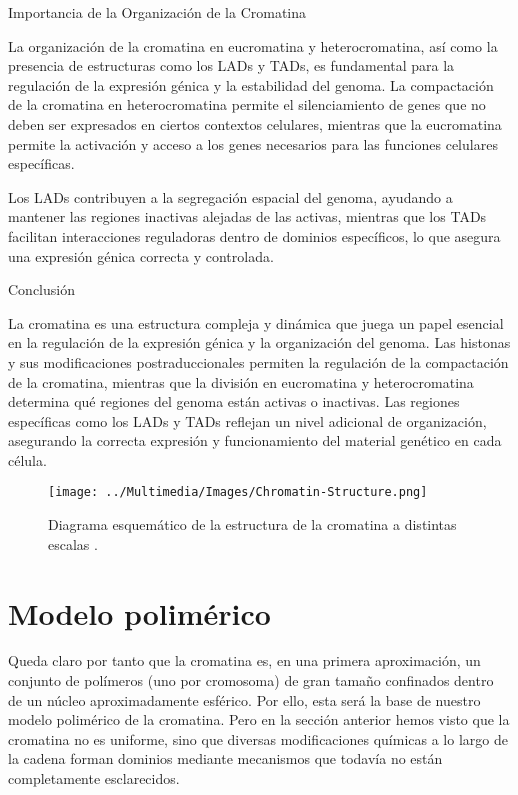 Importancia de la Organización de la Cromatina

La organización de la cromatina en eucromatina y heterocromatina, así como la presencia de estructuras como los LADs y TADs, es fundamental para la regulación de la expresión génica y la estabilidad del genoma. La compactación de la cromatina en heterocromatina permite el silenciamiento de genes que no deben ser expresados en ciertos contextos celulares, mientras que la eucromatina permite la activación y acceso a los genes necesarios para las funciones celulares específicas.

Los LADs contribuyen a la segregación espacial del genoma, ayudando a mantener las regiones inactivas alejadas de las activas, mientras que los TADs facilitan interacciones reguladoras dentro de dominios específicos, lo que asegura una expresión génica correcta y controlada.

Conclusión

La cromatina es una estructura compleja y dinámica que juega un papel esencial en la regulación de la expresión génica y la organización del genoma. Las histonas y sus modificaciones postraduccionales permiten la regulación de la compactación de la cromatina, mientras que la división en eucromatina y heterocromatina determina qué regiones del genoma están activas o inactivas. Las regiones específicas como los LADs y TADs reflejan un nivel adicional de organización, asegurando la correcta expresión y funcionamiento del material genético en cada célula.

\begin{figure}
    \centering
    \texttt{[image: ../Multimedia/Images/Chromatin-Structure.png]}
    \caption{Diagrama esquemático de la estructura de la cromatina a distintas escalas \cite{Misteli2020}.}
    \label{fig:chromatin-structure}
\end{figure}

\section{Modelo polimérico}

Queda claro por tanto que la cromatina es, en una primera aproximación, un conjunto de polímeros (uno por cromosoma) de gran tamaño confinados dentro de un núcleo aproximadamente esférico. Por ello, esta será la base de nuestro modelo polimérico de la cromatina. Pero en la sección anterior hemos visto que la cromatina no es uniforme, sino que diversas modificaciones químicas a lo largo de la cadena forman dominios mediante mecanismos que todavía no están completamente esclarecidos.

